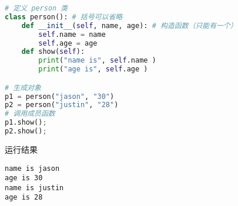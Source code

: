 
\begin{issues}
\issueDraft
\end{issues}


\begin{lstlisting}[language=python]
# 定义 person 类
class person(): # 括号可以省略
    def __init__(self, name, age): # 构造函数（只能有一个）
        self.name = name 
        self.age = age 
    def show(self): 
        print("name is", self.name ) 
        print("age is", self.age ) 

# 生成对象
p1 = person("jason", "30") 
p2 = person("justin", "28")
# 调用成员函数
p1.show();
p2.show();
\end{lstlisting}
运行结果
\begin{lstlisting}
name is jason
age is 30
name is justin
age is 28
\end{lstlisting}

